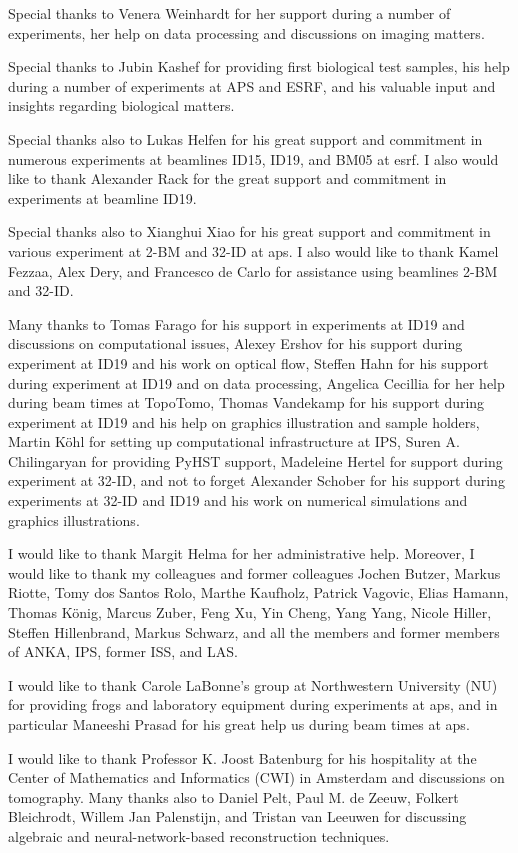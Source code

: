 \documentclass[
twoside,
openright,
titlepage,
numbers=noenddot,
headinclude,
fleqn,
a4paper,
footinclude=true,
cleardoublepage=empty,
abstractoff,
BCOR=5mm,
paper=a4,
fontsize=11pt,
british,ngerman,american,
]{scrreprt}
\begin{document}
 Special thanks to Venera Weinhardt for her support during a
number of experiments, her help on data processing and discussions on
imaging matters.

Special thanks to Jubin Kashef for providing first biological test
samples, his help during a number of experiments at APS and ESRF, and
his valuable input and insights regarding biological matters.

Special thanks also to Lukas Helfen for his great support and
commitment in numerous experiments at beamlines
ID15, ID19, and BM05 at \ac{esrf}.  I also would like to thank
Alexander Rack for the great support and commitment in experiments at
beamline ID19.

Special thanks also to Xianghui Xiao for his great support and
commitment in various experiment at 2-BM and 32-ID at \ac{aps}.  I
also would like to thank Kamel Fezzaa, Alex Dery, and Francesco de
Carlo for assistance using beamlines 2-BM and 32-ID.

Many thanks to Tomas Farago for his support in experiments at ID19 and
discussions on computational issues, Alexey Ershov for his support
during experiment at ID19 and his work on optical flow, Steffen Hahn
for his support during experiment at ID19 and on data processing,
Angelica Cecillia for her help during beam times at TopoTomo, Thomas
Vandekamp for his support during experiment at ID19 and his help on
graphics illustration and sample holders, Martin Köhl for setting up
computational infrastructure at IPS, Suren A. Chilingaryan for
providing PyHST support, Madeleine Hertel for support during
experiment at 32-ID, and not to forget Alexander Schober for his
support during experiments at 32-ID and ID19 and his work on numerical
simulations and graphics illustrations.

I would like to thank Margit Helma for her administrative help.
Moreover, I would like to thank my colleagues and former colleagues
Jochen Butzer, Markus Riotte, Tomy dos Santos Rolo, Marthe Kaufholz,
Patrick Vagovic, Elias Hamann, Thomas König, Marcus Zuber, Feng Xu,
Yin Cheng, Yang Yang, Nicole Hiller, Steffen Hillenbrand, Markus
Schwarz, and all the members and former members of ANKA, IPS, former
ISS, and LAS.

I would like to thank Carole LaBonne's group at Northwestern
University (NU) for providing frogs and laboratory equipment during
experiments at \ac{aps}, and in particular Maneeshi Prasad for his
great help us during beam times at \ac{aps}.

I would like to thank Professor K. Joost Batenburg for his hospitality
at the Center of Mathematics and Informatics (CWI) in Amsterdam and
discussions on tomography.  Many thanks also to Daniel Pelt, Paul
M. de Zeeuw, Folkert Bleichrodt, Willem Jan Palenstijn, and Tristan
van Leeuwen for discussing algebraic and neural-network-based
reconstruction techniques.
\end{document}
